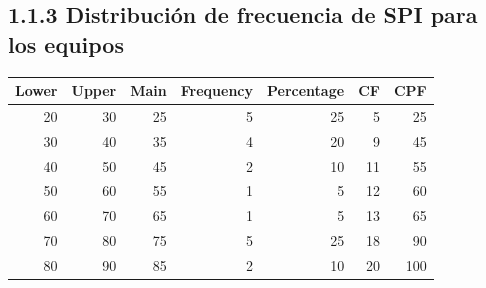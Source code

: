 \documentclass[]{article}
\newenvironment{Shaded}{\begin{snugshade}}{\end{snugshade}}
\newcommand{\CommentTok}[1]{\textcolor[rgb]{0.56,0.35,0.01}{\textit{#1}}}
\newcommand{\DataTypeTok}[1]{\textcolor[rgb]{0.13,0.29,0.53}{#1}}
\newcommand{\KeywordTok}[1]{\textcolor[rgb]{0.13,0.29,0.53}{\textbf{#1}}}
\newcommand{\NormalTok}[1]{#1}
\newcommand{\OperatorTok}[1]{\textcolor[rgb]{0.81,0.36,0.00}{\textbf{#1}}}
\newcommand{\OtherTok}[1]{\textcolor[rgb]{0.56,0.35,0.01}{#1}}
\newcommand{\StringTok}[1]{\textcolor[rgb]{0.31,0.60,0.02}{#1}}
\begin{document}
\hypertarget{distribucion-de-frecuencia-de-spi-para-los-equipos}{%
\subsection{1.1.3 Distribución de frecuencia de SPI para los
equipos}\label{distribucion-de-frecuencia-de-spi-para-los-equipos}}

\begin{Shaded}
\end{Shaded}

\begin{table}[H]
\centering
\begin{tabular}{r|r|r|r|r|r|r}
\hline
Lower & Upper & Main & Frequency & Percentage & CF & CPF\\
\hline
\rowcolor{gray!6}  20 & 30 & 25 & 5 & 25 & 5 & 25\\
\hline
30 & 40 & 35 & 4 & 20 & 9 & 45\\
\hline
\rowcolor{gray!6}  40 & 50 & 45 & 2 & 10 & 11 & 55\\
\hline
50 & 60 & 55 & 1 & 5 & 12 & 60\\
\hline
\rowcolor{gray!6}  60 & 70 & 65 & 1 & 5 & 13 & 65\\
\hline
70 & 80 & 75 & 5 & 25 & 18 & 90\\
\hline
\rowcolor{gray!6}  80 & 90 & 85 & 2 & 10 & 20 & 100\\
\hline
\end{tabular}
\end{table}
\end{document}
